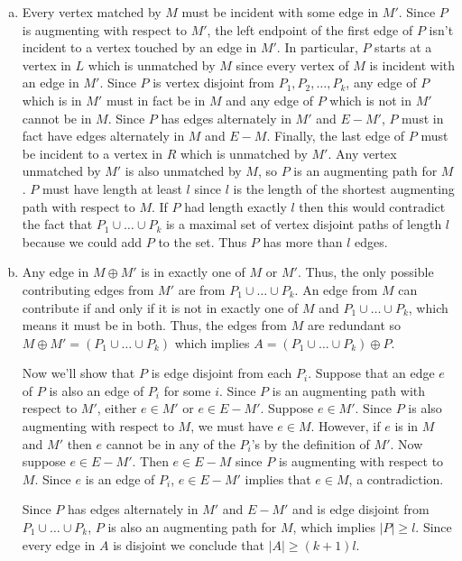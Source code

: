 \documentclass{article}
\begin{document}
\begin{enumerate}[a.]
\item Every vertex matched by $M$ must be incident with some edge in $M'$.  Since $P$ is augmenting with respect to $M'$, the left endpoint of the first edge of $P$ isn't incident to a vertex touched by an edge in $M'$. In particular, $P$ starts at a vertex in $L$ which is unmatched by $M$ since every vertex of $M$ is incident with an edge in $M'$.  Since $P$ is vertex disjoint from $P_1, P_2, \ldots, P_k$, any edge of $P$ which is in $M'$ must in fact be in $M$ and any edge of $P$ which is not in $M'$ cannot be in $M$.  Since $P$ has edges alternately in $M'$ and $E - M'$, $P$ must in fact have edges alternately in $M$ and $E-M$.  Finally, the last edge of $P$ must be incident to a vertex in $R$ which is unmatched by $M'$.  Any vertex unmatched by $M'$ is also unmatched by $M$, so $P$ is an augmenting path for $M$.  $P$ must have length at least $l$ since $l$ is the length of the shortest augmenting path with respect to $M$. If $P$ had length exactly $l$ then this would contradict the fact that $P_1 \cup \ldots \cup P_k$ is a maximal set of vertex disjoint paths of length $l$ because we could add $P$ to the set. Thus $P$ has more than $l$ edges. 

\item Any edge in $M \oplus M'$ is in exactly one of $M$ or $M'$.  Thus, the only possible contributing edges from $M'$ are from $P_1 \cup \ldots \cup P_k$.  An edge from $M$ can contribute if and only if it is not in exactly one of $M$ and $P_1 \cup \ldots \cup P_k$, which means it must be in both.  Thus, the edges from $M$ are redundant so $M\oplus M' = (P_1 \cup \ldots \cup P_k)$ which implies $A = (P_1 \cup \ldots \cup P_k) \oplus P$.  

Now we'll show that $P$ is edge disjoint from each $P_i$.  Suppose that an edge $e$ of $P$ is also an edge of $P_i$ for some $i$.  Since $P$ is an augmenting path with respect to $M'$, either $e \in M'$ or $e \in E-M'$.  Suppose $e \in M'$.  Since $P$ is also augmenting with respect to $M$, we must have $e \in M$.  However, if $e$ is in $M$ and $M'$ then $e$ cannot be in any of the $P_i$'s by the definition of $M'$.  Now suppose $e \in E-M'$. Then $e \in E-M$ since $P$ is augmenting with respect to $M$. Since $e$ is an edge of $P_i$, $e \in E-M'$ implies that $e \in M$, a contradiction.  

Since $P$ has edges alternately in $M'$ and $E-M'$ and is edge disjoint from $P_1 \cup \ldots \cup P_k$, $P$ is also an augmenting path for $M$, which implies $|P| \geq l$.  Since every edge in $A$ is disjoint we conclude that $|A| \geq (k+1)l$.


\end{enumerate}
\end{document}
